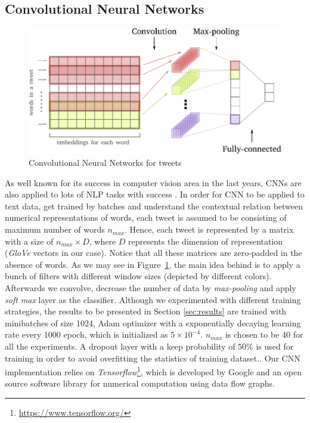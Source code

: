 \subsection{Convolutional Neural Networks}
\begin{figure}[t]
	\centering
	\includegraphics[width=0.8\columnwidth]{CNN_text.pdf}
	\caption{Convolutional Neural Networks for tweets}
	\label{fig:cnn}
\end{figure}

As well known for its success in computer vision area in the last years, CNNs are also applied to lots of NLP tasks with success \cite{kim14conv}. 
In order for CNN to be applied to text data, get trained by batches and understand the contextual relation between numerical representations of words, each tweet is assumed to be consisting of maximum number of words $n_{max}$. 
Hence, each tweet is represented by a matrix with a size of $n_{max} \times D$, where $D$ represents the dimension of representation (\textit{GloVe} vectors in our case).
Notice that all these matrices are zero-padded in the absence of words.
As we may see in Figure~\ref{fig:cnn}, the main idea behind is to apply a bunch of filters with different window sizes (depicted by different colors). Afterwards we convolve, decrease the number of data by \textit{max-pooling} and apply \textit{soft max} layer as the classifier.
Although we experimented with different training strategies, the results to be presented in Section \ref{sec:results} are trained with minibatches of size 1024, Adam optimizer with a exponentially decaying learning rate every 1000 epoch, which is initialized as $5 \times 10^{-4}$. 
$n_{max}$ is chosen to be 40 for all the experiments.
A dropout layer with a keep probability of $50\%$ is used for training in order to avoid overfitting the statistics of training dataset..
Our CNN implementation relies on \textit{Tensorflow}\footnote{\url{https://www.tensorflow.org/}}, which is developed by Google and an open source software library for numerical computation using data flow graphs.